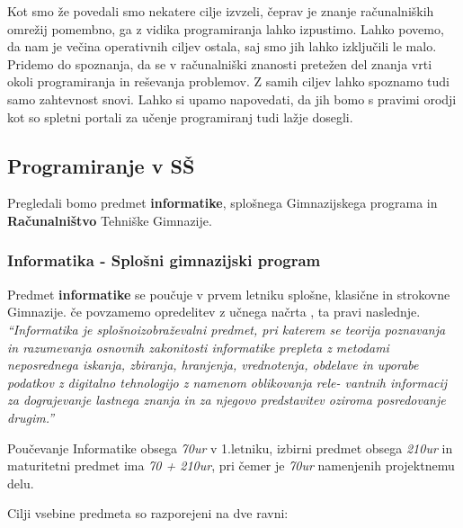 Kot smo že povedali smo nekatere cilje izvzeli, čeprav je znanje
računalniških omrežij pomembno, ga z vidika programiranja lahko
izpustimo. Lahko povemo, da nam je večina operativnih ciljev ostala,
saj smo jih lahko izključili le malo. Pridemo do spoznanja, da se v
računalniški znanosti pretežen del znanja vrti okoli programiranja in
reševanja problemov. Z samih ciljev lahko spoznamo tudi samo
zahtevnost snovi. Lahko si upamo napovedati, da jih bomo s pravimi
orodji kot so spletni portali za učenje programiranj tudi lažje
dosegli.

\subsection{Programiranje v SŠ}
\label{sec:Programiranje_v_SŠ}



Pregledali bomo predmet \textbf{informatike}, splošnega Gimnazijskega
programa in \textbf{Računalništvo} Tehniške Gimnazije.

\subsubsection{Informatika - Splošni gimnazijski program}
\label{sec:informatika_splošni_gim_program}

Predmet \textbf{informatike} se poučuje v prvem letniku splošne,
klasične in strokovne Gimnazije. če povzamemo opredelitev z učnega
načrta \cite{ucni_nacrt-informatika-gim}, ta pravi
naslednje. \emph{``Informatika je splošnoizobraževalni predmet, pri
  katerem se teorija poznavanja in razumevanja osnovnih zakonitosti
  informatike prepleta z metodami neposrednega iskanja, zbiranja,
  hranjenja, vrednotenja, obdelave in uporabe podatkov z digitalno
  tehnologijo z namenom oblikovanja rele- vantnih informacij za
  dograjevanje lastnega znanja in za njegovo predstavitev oziroma
  posredovanje drugim.''}

Poučevanje Informatike obsega \emph{70ur} v 1.letniku, izbirni predmet
obsega \emph{210ur} in maturitetni predmet ima \emph{70 + 210ur}, pri
čemer je \emph{70ur} namenjenih projektnemu delu.

Cilji vsebine predmeta so razporejeni na dve ravni:

